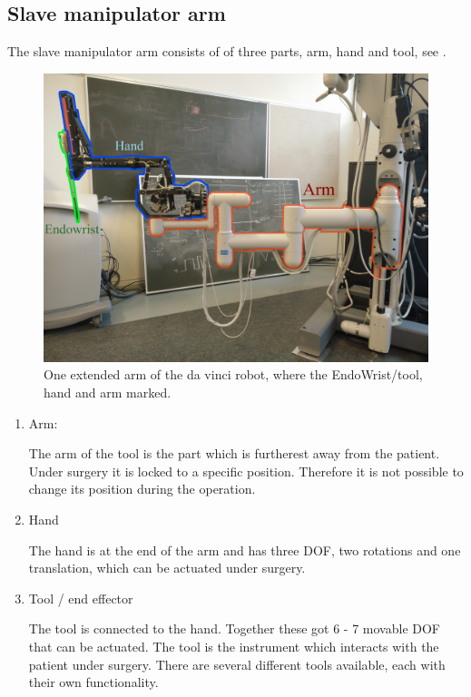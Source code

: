 

\subsection*{Slave manipulator arm}
The slave manipulator arm consists of of three parts, arm, hand and tool, see .

\begin{figure}[H]
	\centering
		\centering
		\includegraphics[width=0.85\linewidth]{davincirobotarm_label.jpg}
		\caption{One extended arm of the da vinci robot, where the EndoWrist/tool, hand and arm marked.}
		\label{fig:davinciarmrobot}
\end{figure}


\begin{enumerate}
\item Arm:

The arm of the tool is the part which is furtherest away from the patient. 
Under surgery it is locked to a specific position. Therefore it is not possible to change its position during the operation.
\item Hand

The hand is at the end of the arm and has three \gls{DOF}, two rotations and one translation, which can be actuated under surgery. 
\item Tool / end effector 

The tool is connected to the hand. Together these got 6 - 7 movable \gls{DOF} that can be actuated. The tool is the instrument which interacts with the patient under surgery. There are several different tools available, each with their own functionality. 
\end{enumerate}

